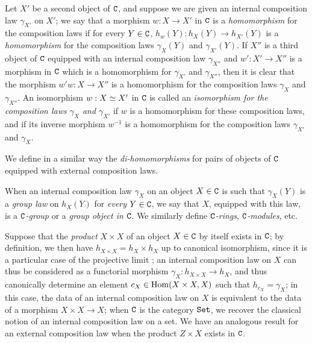 \begin{env}[8.2.2]
\label{0.8.2.2}
Let $X'$ be a second object of $\mathtt{C}$, and suppose we are given an internal composition law $\gamma_{X'}$ on $X'$; we say that a morphism $w:X\to X'$ in $\mathtt{C}$ is a \emph{homomorphism} for the composition laws if for every $Y\in\mathtt{C}$, $h_w(Y):h_X(Y)\to h_{X'}(Y)$ is a \emph{homomorphism} for the composition laws $\gamma_X(Y)$ and $\gamma_{X'}(Y)$.
If $X''$ is a third
object of $\mathtt{C}$ equipped with an internal composition law $\gamma_{X''}$ and $w':X'\to X''$ is a morphism in $\mathtt{C}$ which is a homomorphism for $\gamma_{X'}$ and $\gamma_{X''}$, then it is clear that the morphism $w'w:X\to X''$ is a homomorphism for the composition laws $\gamma_X$ and $\gamma_{X''}$.
An isomorphism $w:X\simeq X'$ in $\mathtt{C}$ is called an \emph{isomorphism for the composition laws $\gamma_X$ and $\gamma_{X'}$} if $w$ is a homomorphism for these composition laws, and if its inverse morphism $w^{-1}$ is a homomorphism for the composition laws $\gamma_{X'}$ and $\gamma_X$.

We define in a similar way the \emph{di-homomorphisms} for pairs of objects of $\mathtt{C}$ equipped with external composition laws.
\end{env}

\begin{env}[8.2.3]
\label{0.8.2.3}
When an internal composition law $\gamma_X$ on an object $X\in\mathtt{C}$ is such that $\gamma_X(Y)$ is a \emph{group law} on $h_X(Y)$ for \emph{every} $Y\in\mathtt{C}$, we say that $X$, equipped with this law, is a \emph{$\mathtt{C}$-group} or a \emph{group object in $\mathtt{C}$}.
We similarly define \emph{$\mathtt{C}$-rings}, \emph{$\mathtt{C}$-modules}, etc.
\end{env}

\begin{env}[8.2.4]
\label{0.8.2.4}
Suppose that the \emph{product} $X\times X$ of an object $X\in\mathtt{C}$ by itself exists in $\mathtt{C}$; by definition, we then have $h_{X\times X}=h_X\times h_X$ up to canonical isomorphism, since it is a particular case of the projective limit ; an internal composition law on $X$ can thus be considered as a functorial morphism $\gamma_X:h_{X\times X}\to h_X$, and thus canonically determine  an element $c_X\in{\mathop{\mathrm{Hom}}\nolimits}(X\times X,X)$ such that $h_{c_X}=\gamma_X$; in this case, the data of an internal composition law on $X$ is equivalent to the data of a morphism $X\times X\to X$; when $\mathtt{C}$ is the category $\mathtt{Set}$, we recover the classical notion of an internal composition law on a set.
We have an analogous result for an external composition law when the product $Z\times X$ exists in $\mathtt{C}$.
\end{env}

